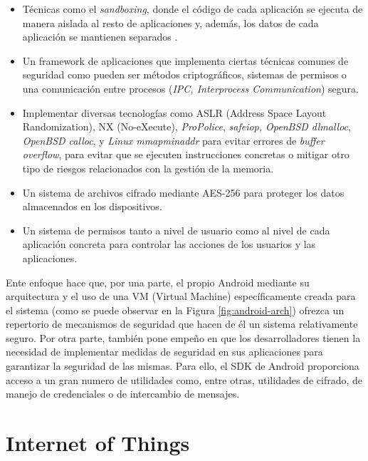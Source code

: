 \begin{itemize}
	\item Técnicas como el \emph{sandboxing}, donde el código de cada aplicación se ejecuta de manera aislada al resto de aplicaciones y, además, los datos de cada aplicación se mantienen separados \cite{jspdcp-2014}. 
	\item Un framework de aplicaciones que implementa ciertas técnicas comunes de seguridad como pueden ser métodos criptográficos, sistemas de permisos o una comunicación entre procesos (\textit{IPC, Interprocess Communication}) segura.	
	\item Implementar diversas tecnologías como ASLR (Address Space Layout Randomization), NX (No-eXecute), \textit{ProPolice}, \textit{safe\textunderscore iop, OpenBSD dlmalloc}, \textit{OpenBSD calloc}, y \textit{Linux mmap\textunderscore min\textunderscore addr} para evitar errores de \textit{buffer overflow}, para evitar que se ejecuten instrucciones concretas o mitigar otro tipo de riesgos relacionados con la gestión de la memoria.
	\item Un sistema de archivos cifrado mediante AES-256 para proteger los datos almacenados en los dispositivos.
	\item Un sistema de permisos tanto a nivel de usuario como al nivel de cada aplicación concreta para controlar las acciones de los usuarios y las aplicaciones.
\end{itemize}

Ente enfoque hace que, por una parte, el propio Android mediante su arquitectura y el uso de una VM (Virtual Machine) específicamente creada para el sistema (como se puede observar en la Figura \ref{fig:android-arch}) ofrezca un repertorio de mecanismos de seguridad que hacen de él un sistema relativamente seguro. Por otra parte, también pone empeño en que los desarrolladores tienen la necesidad de implementar medidas de seguridad en sus aplicaciones para garantizar la seguridad de las mismas. Para ello, el SDK de Android proporciona acceso a un gran numero de utilidades como, entre otras, utilidades de cifrado, de manejo de credenciales o de intercambio de mensajes.



\section{Internet of Things}


